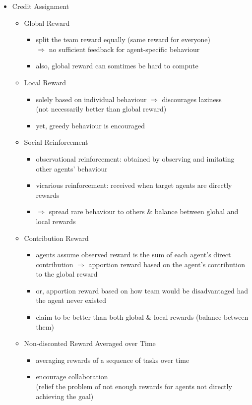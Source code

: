 \begin{itemize}
\item Credit Assignment
	\begin{itemize}
	\item Global Reward
		\begin{itemize}
		\item split the team reward equally (same reward for everyone) \\
		$\Rightarrow$ no sufficient feedback for agent-specific behaviour \\
		\item also, global reward can somtimes be hard to compute
		\end{itemize}
	\item Local Reward
		\begin{itemize}
		\item solely based on individual behaviour  $\Rightarrow$ discourages laziness \\
		(not necessarily better than global reward)
		\item yet, greedy behaviour is encouraged
		\end{itemize}
	\item Social Reinforcement
		\begin{itemize}
		\item observational reinforcement: obtained by observing and imitating other agents' behaviour
		\item vicarious reinforcement: received when target agents are directly rewards 
		\item $\Rightarrow$ spread rare behaviour to others \& balance between global and local rewards
		\end{itemize}
	\item Contribution Reward
		\begin{itemize}
		\item agents assume observed reward is the sum of each agent's direct contribution
		$\Rightarrow$ apportion reward based on the agent's contribution to the global reward
		\item or, apportion reward based on how team would be disadvantaged had the agent never existed
		\item claim to be better than both global \& local rewards (balance between them)
		\end{itemize}
	\item Non-disconted Reward Averaged over Time
		\begin{itemize}
		\item averaging rewards of a sequence of tasks over time
		\item encourage collaboration \\
		(relief the problem of not enough rewards for agents not directly achieving the goal)
		\end{itemize}
	\end{itemize}


\end{itemize}
